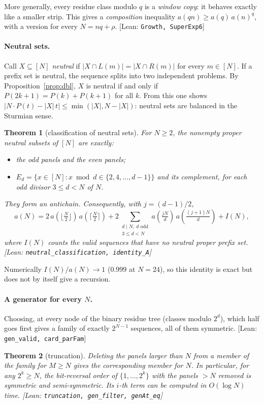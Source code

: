 \documentclass[11pt]{article}
\newtheorem{theorem}{Theorem}
\theoremstyle{definition}
\theoremstyle{remark}
\newcommand{\lean}[1]{\textsf{\small[Lean: \texttt{#1}]}}
\begin{document}
More generally, every residue class modulo $q$ is a \emph{window copy}: it behaves
exactly like a smaller strip. This gives a \emph{composition} inequality
$a(qn)\ge a(q)\,a(n)^q$, with a version for every $N=nq+\rho$. \lean{Growth,
SuperExp6}

\paragraph{Neutral sets.}
Call $X\subseteq[N]$ \emph{neutral} if $|X\cap L(m)|=|X\cap R(m)|$ for every
$m\in[N]$. If a prefix set is neutral, the sequence splits into two independent
problems. By Proposition~\ref{prop:dbl}, $X$ is neutral if and only if
$P(2k+1)=P(k)+P(k+1)$ for all $k$. From this one shows
$|N\cdot P(t)-|X|\,t|\le\min(|X|,N-|X|)$: neutral sets are balanced in the Sturmian
sense.

\begin{theorem}[classification of neutral sets]
For $N\ge 2$, the nonempty proper neutral subsets of $[N]$ are exactly:
\begin{itemize}
  \item the odd panels and the even panels;
  \item $E_d=\{x\in[N]: x\bmod d\in\{2,4,\dots,d-1\}\}$ and its complement, for each
    odd divisor $3\le d<N$ of $N$.
\end{itemize}
They form an antichain. Consequently, with $j=(d-1)/2$,
\[
  a(N)=2\,a(\lfloor\tfrac N2\rfloor)\,a(\lceil\tfrac N2\rceil)
   +2\!\!\sum_{\substack{d\mid N,\ d \text{ odd}\\ 3\le d<N}}\!\! a(\tfrac{jN}d)\,a(\tfrac{(j+1)N}d)
   + I(N),
\]
where $I(N)$ counts the valid sequences that have no neutral proper prefix set.
\lean{neutral\_classification, identity\_A}
\end{theorem}

Numerically $I(N)/a(N)\to1$ ($0.999$ at $N=24$), so this identity is exact but does
not by itself give a recursion.

\paragraph{A generator for every $N$.}
Choosing, at every node of the binary residue tree (classes modulo $2^d$), which half
goes first gives a family of exactly $2^{N-1}$ sequences, all of them symmetric.
\lean{gen\_valid, card\_parFam}

\begin{theorem}[truncation]
Deleting the panels larger than $N$ from a member of the family for $M\ge N$ gives the
corresponding member for $N$. In particular, for any $2^k\ge N$, the bit-reversal order
of $\{1,\dots,2^k\}$ with the panels $>N$ removed is symmetric and semi-symmetric.
Its $i$-th term can be computed in $O(\log N)$ time.
\lean{truncation, gen\_filter, genAt\_eq}
\end{theorem}
\end{document}
